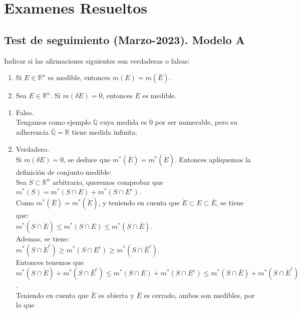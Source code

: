 \section{Examenes Resueltos}

\subsection{Test de seguimiento (Marzo-2023). Modelo A}

\begin{problem}{1}
    Indicar si las afirmaciones siguientes son verdaderas o falsas:
    \begin{enumerate}
        \item Si $E \in \mathbb{R}^n$ es medible, entonces $m(E) = m(\bar{E})$.
        \item Sea $E \in \mathbb{R}^n$. Si $m(\delta E)=0$, entonces $E$ es medible.
    \end{enumerate}
\end{problem}

\begin{sol}
    \begin{enumerate}
        \item Falso. \\
        Tengamos como ejemplo $\mathbb{Q}$ cuya medida es $0$ por ser numerable, pero su adherencia $\bar{\mathbb{Q}}=\mathbb{R}$ tiene medida infinita.
        \item Verdadero. \\
        Si $m(\delta E)=0$, se deduce que $m^{*}(\bar{E})=m^{*}(\mathring{E})$. Entonces apliquemos la definición de conjunto medible: \\
        Sea $S \subset \mathbb{R}^n$ arbitrario, queremos comprobar que $m^{*}(S)=m^{*}(S \cap E)+m^{*}(S \cap E^c)$. \\
        Como $m^{*}(\bar{E})=m^{*}(\mathring{E})$, y teniendo en cuenta que $\mathring{E} \subset E \subset \bar{E}$, se tiene que: \\
        $m^{*}(S \cap \mathring{E}) \leq m^{*}(S \cap E) \leq m^{*}(S \cap \bar{E})$. \\
        Ademas, se tiene: \\
        $m^{*}(S \cap \mathring{E}^c) \geq m^{*}(S \cap E^c) \geq m^{*}(S \cap \bar{E}^c)$. \\
        Entonces tenemos que $m^{*}(S \cap \mathring{E})+m^{*}(S \cap \bar{E}^c) \leq m^{*}(S \cap E)+m^{*}(S \cap E^c) \leq m^{*}(S \cap \bar{E})+m^{*}(S \cap \mathring{E}^c)$. \\
        Teniendo en cuenta que $\mathring{E}$ es abierta y $\bar{E}$ es cerrado, ambos son medibles, por lo que 
    \end{enumerate}
\end{sol}